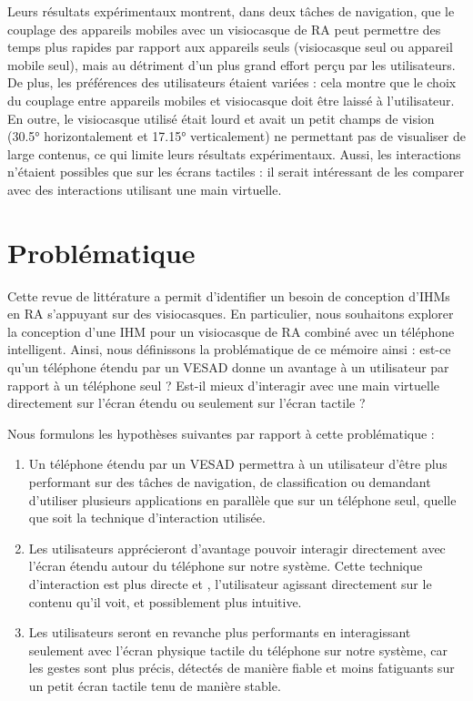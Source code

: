 
Leurs résultats expérimentaux montrent, dans deux tâches de navigation, que le couplage des appareils mobiles avec un visiocasque de RA peut permettre des temps plus rapides par rapport aux appareils seuls (visiocasque seul ou appareil mobile seul), mais au détriment d'un plus grand effort perçu par les utilisateurs. De plus, les préférences des utilisateurs étaient variées : cela montre que le choix du couplage entre appareils mobiles et visiocasque doit être laissé à l'utilisateur.
En outre, le visiocasque utilisé était lourd et avait un petit champs de vision (\ang{30.5} horizontalement et \ang{17.15} verticalement) ne permettant pas de visualiser de large contenus, ce qui limite leurs résultats expérimentaux. Aussi, les interactions n'étaient possibles que sur les écrans tactiles : il serait intéressant de les comparer avec des interactions utilisant une main virtuelle.


\section{Problématique}
\label{sec:research_problem}
Cette revue de littérature a permit d'identifier un besoin de conception d'IHMs en RA s'appuyant sur des visiocasques. En particulier, nous souhaitons explorer la conception d'une IHM pour un visiocasque de RA combiné avec un téléphone intelligent. Ainsi, nous définissons la problématique de ce mémoire ainsi : est-ce qu'un téléphone étendu par un VESAD donne un avantage à un utilisateur par rapport à un téléphone seul ? Est-il mieux d'interagir avec une main virtuelle directement sur l'écran étendu ou seulement sur l'écran tactile ?

Nous formulons les hypothèses suivantes par rapport à cette problématique :
\begin{enumerate}[label={(H\arabic*)}]
  \item Un téléphone étendu par un VESAD permettra à un utilisateur d'être plus performant sur des tâches de navigation, de classification ou demandant d'utiliser plusieurs applications en parallèle que sur un téléphone seul, quelle que soit la technique d'interaction utilisée.
  \item Les utilisateurs apprécieront d'avantage pouvoir interagir directement avec l'écran étendu autour du téléphone sur notre système. Cette technique d'interaction est plus directe et , l'utilisateur agissant directement sur le contenu qu'il voit, et possiblement plus intuitive.
  \item Les utilisateurs seront en revanche plus performants en interagissant seulement avec l'écran physique tactile du téléphone sur notre système, car les gestes sont plus précis, détectés de manière fiable et moins fatiguants sur un petit écran tactile tenu de manière stable.
\end{enumerate}

